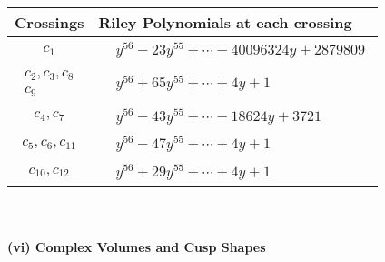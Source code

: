\documentclass[1p]{elsarticle_modified}
\theoremstyle{definition}
\begin{document}
\begin{tabular}{m{50pt}|m{274pt}}
Crossings & \hspace{64pt}Riley Polynomials at each crossing \\
\hline $$\begin{aligned}c_{1}\end{aligned}$$&$\begin{aligned}
&y^{56}-23 y^{55}+\cdots-40096324 y+2879809
\end{aligned}$\\
\hline $$\begin{aligned}c_{2},c_{3},c_{8}\\c_{9}\end{aligned}$$&$\begin{aligned}
&y^{56}+65 y^{55}+\cdots+4 y+1
\end{aligned}$\\
\hline $$\begin{aligned}c_{4},c_{7}\end{aligned}$$&$\begin{aligned}
&y^{56}-43 y^{55}+\cdots-18624 y+3721
\end{aligned}$\\
\hline $$\begin{aligned}c_{5},c_{6},c_{11}\end{aligned}$$&$\begin{aligned}
&y^{56}-47 y^{55}+\cdots+4 y+1
\end{aligned}$\\
\hline $$\begin{aligned}c_{10},c_{12}\end{aligned}$$&$\begin{aligned}
&y^{56}+29 y^{55}+\cdots+4 y+1
\end{aligned}$\\
\hline
\end{tabular}\\~\\
\newpage\flushleft \textbf{(vi) Complex Volumes and Cusp Shapes}
\end{document}
